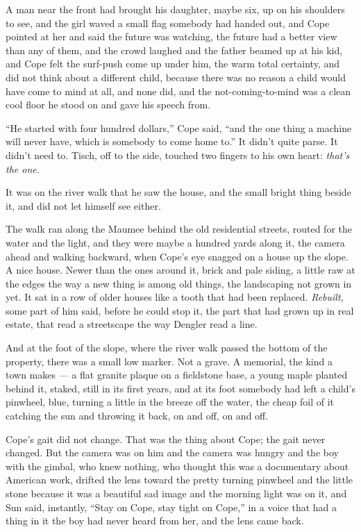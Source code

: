 \documentclass[11pt,openany]{book}
\begin{document}
A man near the front had brought his daughter, maybe six, up on his shoulders to see, and the girl waved a small flag somebody had handed out, and Cope pointed at her and said the future was watching, the future had a better view than any of them, and the crowd laughed and the father beamed up at his kid, and Cope felt the surf-push come up under him, the warm total certainty, and did not think about a different child, because there was no reason a child would have come to mind at all, and none did, and the not-coming-to-mind was a clean cool floor he stood on and gave his speech from.

``He started with four hundred dollars,'' Cope said, ``and the one thing a machine will never have, which is somebody to come home to.'' It didn't quite parse. It didn't need to. Tisch, off to the side, touched two fingers to his own heart: \textit{that's the one.}

It was on the river walk that he saw the house, and the small bright thing beside it, and did not let himself see either.

The walk ran along the Maumee behind the old residential streets, routed for the water and the light, and they were maybe a hundred yards along it, the camera ahead and walking backward, when Cope's eye snagged on a house up the slope. A nice house. Newer than the ones around it, brick and pale siding, a little raw at the edges the way a new thing is among old things, the landscaping not grown in yet. It sat in a row of older houses like a tooth that had been replaced. \textit{Rebuilt,} some part of him said, before he could stop it, the part that had grown up in real estate, that read a streetscape the way Dengler read a line.

And at the foot of the slope, where the river walk passed the bottom of the property, there was a small low marker. Not a grave. A memorial, the kind a town makes --- a flat granite plaque on a fieldstone base, a young maple planted behind it, staked, still in its first years, and at its foot somebody had left a child's pinwheel, blue, turning a little in the breeze off the water, the cheap foil of it catching the sun and throwing it back, on and off, on and off.

Cope's gait did not change. That was the thing about Cope; the gait never changed. But the camera was on him and the camera was hungry and the boy with the gimbal, who knew nothing, who thought this was a documentary about American work, drifted the lens toward the pretty turning pinwheel and the little stone because it was a beautiful sad image and the morning light was on it, and Sun said, instantly, ``Stay on Cope, stay tight on Cope,'' in a voice that had a thing in it the boy had never heard from her, and the lens came back.
\end{document}
